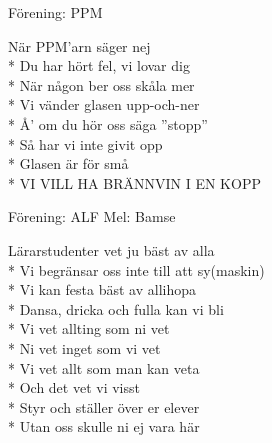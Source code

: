 \begin{SongText} 
    \begin{SongInfo}
        Förening: PPM
    \end{SongInfo}
    \begin{SongVerse}
        När PPM’arn säger nej\\*%
        Du har hört fel, vi lovar dig\\*%
        När någon ber oss skåla mer\\*%
        Vi vänder glasen upp-och-ner\\*%
        Å’ om du hör oss säga ”stopp”\\*%
        Så har vi inte givit opp\\*%
        Glasen är för små\\*%
        VI VILL HA BRÄNNVIN I EN KOPP
    \end{SongVerse}
\end{SongText}

\begin{SongText}
    \begin{SongInfo}
        Förening: ALF
        Mel: Bamse
    \end{SongInfo}
    \begin{SongVerse}
        Lärarstudenter vet ju bäst av alla\\*%
        Vi begränsar oss inte till att sy(maskin)\\*%
        Vi kan festa bäst av allihopa\\*%
        Dansa, dricka och fulla kan vi bli\\*%
        Vi vet allting som ni vet\\*%
        Ni vet inget som vi vet\\*%
        Vi vet allt som man kan veta\\*%
        Och det vet vi visst\\*%
        Styr och ställer över er elever\\*%
        Utan oss skulle ni ej vara här
    \end{SongVerse}
\end{SongText}

